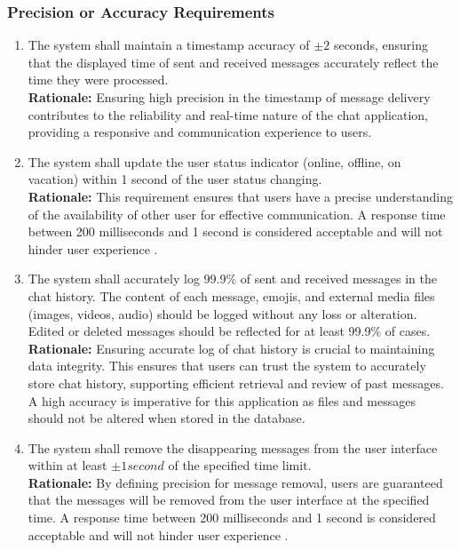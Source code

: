 \documentclass[]{article}
\begin{document}
\subsubsection{Precision or Accuracy Requirements}
\label{ssub:precision_or_accuracy_requirements}
\begin{enumerate}[{PR-PA}1. ]
    \item The system shall maintain a timestamp accuracy of $\pm 2$ seconds, ensuring that the displayed
    time of sent and received messages accurately reflect the time they were processed. \\
    {\bf Rationale:} Ensuring high precision in the timestamp of message delivery contributes to the reliability
    and real-time nature of the chat application,  providing a responsive and communication experience to users.
    \item  The system shall update the user status indicator (online, offline, on vacation) within 1 second of the user 
    status changing. \\
    {\bf Rationale:} This requirement ensures that users have a precise understanding of the availability of other user for effective communication.
    A response time between 200 milliseconds and 1 second is considered acceptable and will not hinder user experience 
    \cite{5c}. 
    \item  The system shall accurately log 99.9\% of sent and received messages in the chat history. The content of each message, emojis, and external media files (images, videos, audio)
    should be logged without any loss or alteration. Edited or deleted messages should be reflected for at least 99.9\% of cases. \\
    {\bf Rationale:} Ensuring accurate log of chat history is crucial to maintaining data integrity. This ensures that users can trust the system to accurately
    store chat history, supporting efficient retrieval and review of past messages. A high accuracy is imperative for this application as files and messages should not be altered when stored in the database.
    \item The system shall remove the disappearing messages from the user interface within at least $\pm 1 second$ of the specified time limit. \\
    {\bf Rationale:} By defining precision for message removal, users are guaranteed that the messages will be removed from 
    the user interface at the specified time. A response time between 200 milliseconds and 1 second is considered acceptable and will not hinder user experience
    \cite{5c}. 
\end{enumerate}
\end{document}
